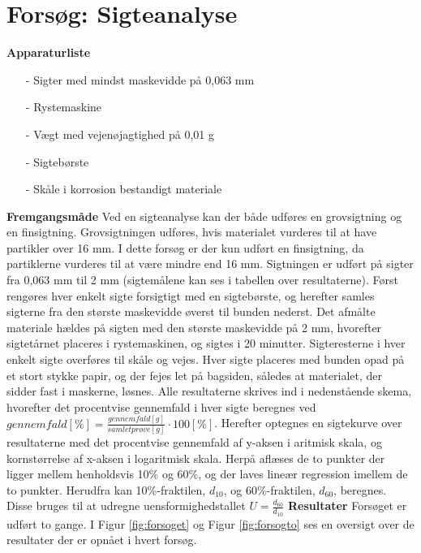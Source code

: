 \chapter{Forsøg: Sigteanalyse}

\textbf{Apparaturliste}
\begin{itemize}
	\item[-] Sigter med mindst maskevidde på 0,063 mm
	\item[-] Rystemaskine
	\item[-] Vægt med vejenøjagtighed på 0,01 g
	\item[-] Sigtebørste
	\item[-] Skåle i korrosion bestandigt materiale
\end{itemize}
\textbf{Fremgangsmåde}
\newline
Ved en sigteanalyse kan der både udføres en grovsigtning og en finsigtning. Grovsigtningen udføres, hvis materialet vurderes til at have partikler over 16 mm. I dette forsøg er der kun udført en finsigtning, da partiklerne vurderes til at være mindre end 16 mm. Sigtningen er udført på sigter fra 0,063 mm til 2 mm (sigtemålene kan ses i tabellen over resultaterne). 
\newline \indent{     }   Først rengøres hver enkelt sigte forsigtigt med en sigtebørste, og herefter samles sigterne fra den største maskevidde øverst til bunden nederst. Det afmålte materiale hældes på sigten med den største maskevidde på 2 mm, hvorefter sigtetårnet placeres i rystemaskinen, og sigtes i 20 minutter.
\newline \indent{     }   Sigteresterne i hver enkelt sigte overføres til skåle og vejes. Hver sigte placeres med bunden opad på et stort stykke papir, og der fejes let på bagsiden, således at materialet, der sidder fast i maskerne, løsnes.
\newline \indent{     }   Alle resultaterne skrives ind i nedenstående skema, hvorefter det procentvise gennemfald i hver sigte beregnes ved $gennemfald [\%] = \frac{gennemfald [g]}{samlet prøve [g]}\cdot 100 [\%]$. Herefter optegnes en sigtekurve over resultaterne med det procentvise gennemfald af y-aksen i aritmisk skala, og kornstørrelse af x-aksen i logaritmisk skala. Herpå aflæses de to punkter der ligger mellem henholdsvis 10\% og 60\%, og der laves lineær regression imellem de to punkter. Herudfra kan 10\%-fraktilen, $d_{10}$, og 60\%-fraktilen, $d_{60}$, beregnes. Disse bruges til at udregne uensformighedstallet $U = \frac{d_{60}}{d_{10}}$
\newline
\newline
\textbf{Resultater}
\newline
Forsøget er udført to gange. I Figur \ref{fig:forsoget} og Figur \ref{fig:forsogto} ses en oversigt over de resultater der er opnået i hvert forsøg. 

